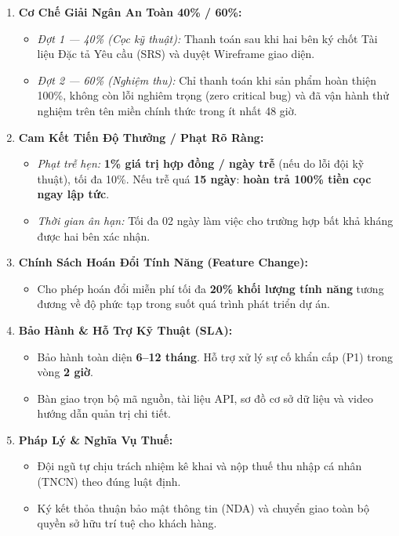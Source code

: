 \documentclass[11pt,a4paper]{article}
\begin{document}
\begin{enumerate}[leftmargin=*,itemsep=4pt,topsep=1pt]
    \item \textbf{Cơ Chế Giải Ngân An Toàn 40\% / 60\%:}
    \begin{itemize}[itemsep=1.8pt]
        \item \textit{Đợt 1 --- 40\% (Cọc kỹ thuật):} Thanh toán sau khi hai bên ký chốt Tài liệu Đặc tả Yêu cầu (SRS) và duyệt Wireframe giao diện.
        \item \textit{Đợt 2 --- 60\% (Nghiệm thu):} Chỉ thanh toán khi sản phẩm hoàn thiện 100\%, không còn lỗi nghiêm trọng (zero critical bug) và đã vận hành thử nghiệm trên tên miền chính thức trong ít nhất 48 giờ.
    \end{itemize}

    \item \textbf{Cam Kết Tiến Độ Thưởng / Phạt Rõ Ràng:}
    \begin{itemize}[itemsep=1.8pt]
        \item \textit{Phạt trễ hẹn:} \textbf{1\% giá trị hợp đồng / ngày trễ} (nếu do lỗi đội kỹ thuật), tối đa 10\%. Nếu trễ quá \textbf{15 ngày}: \textbf{hoàn trả 100\% tiền cọc ngay lập tức}.
        \item \textit{Thời gian ân hạn:} Tối đa 02 ngày làm việc cho trường hợp bất khả kháng được hai bên xác nhận.
    \end{itemize}

    \item \textbf{Chính Sách Hoán Đổi Tính Năng (Feature Change):}
    \begin{itemize}[itemsep=1.8pt]
        \item Cho phép hoán đổi miễn phí tối đa \textbf{20\% khối lượng tính năng} tương đương về độ phức tạp trong suốt quá trình phát triển dự án.
    \end{itemize}

    \item \textbf{Bảo Hành \& Hỗ Trợ Kỹ Thuật (SLA):}
    \begin{itemize}[itemsep=1.8pt]
        \item Bảo hành toàn diện \textbf{6--12 tháng}. Hỗ trợ xử lý sự cố khẩn cấp (P1) trong vòng \textbf{2 giờ}.
        \item Bàn giao trọn bộ mã nguồn, tài liệu API, sơ đồ cơ sở dữ liệu và video hướng dẫn quản trị chi tiết.
    \end{itemize}

    \item \textbf{Pháp Lý \& Nghĩa Vụ Thuế:}
    \begin{itemize}[itemsep=1.8pt]
        \item Đội ngũ tự chịu trách nhiệm kê khai và nộp thuế thu nhập cá nhân (TNCN) theo đúng luật định.
        \item Ký kết thỏa thuận bảo mật thông tin (NDA) và chuyển giao toàn bộ quyền sở hữu trí tuệ cho khách hàng.
    \end{itemize}
\end{enumerate}
\end{document}
